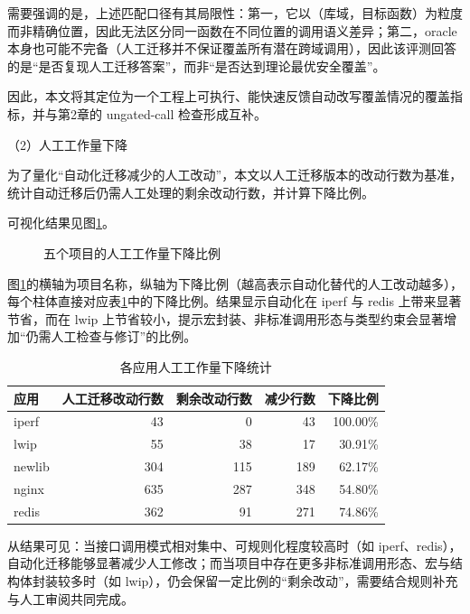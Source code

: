 \documentclass[UTF8,a4paper,12pt]{ctexart}
\numberwithin{equation}{section}
\begin{document}
需要强调的是，上述匹配口径有其局限性：第一，它以（库域，目标函数）为粒度而非精确位置，因此无法区分同一函数在不同位置的调用语义差异；第二，oracle
本身也可能不完备（人工迁移并不保证覆盖所有潜在跨域调用），因此该评测回答的是``是否复现人工迁移答案''，而非``是否达到理论最优安全覆盖''。

因此，本文将其定位为一个工程上可执行、能快速反馈自动改写覆盖情况的覆盖指标，并与第2章的
ungated-call 检查形成互补。

（2）人工工作量下降

为了量化``自动化迁移减少的人工改动''，本文以人工迁移版本的改动行数为基准，统计自动迁移后仍需人工处理的剩余改动行数，并计算下降比例。

可视化结果见图\ref{fig:auto-manual-effort-reduction}。
\begin{figure}
  \centering
  
  \caption{五个项目的人工工作量下降比例}
  \label{fig:auto-manual-effort-reduction}
\end{figure}

图\ref{fig:auto-manual-effort-reduction}的横轴为项目名称，纵轴为下降比例（越高表示自动化替代的人工改动越多），每个柱体直接对应表\ref{tab:manual-effort-reduction-by-app}中的下降比例。结果显示自动化在 iperf 与 redis 上带来显著节省，而在 lwip 上节省较小，提示宏封装、非标准调用形态与类型约束会显著增加``仍需人工检查与修订''的比例。


{\small
\setlength{\tabcolsep}{4pt}
\begin{longtable}{@{}lrrrr@{}}
\caption{各应用人工工作量下降统计}\label{tab:manual-effort-reduction-by-app}\\
\toprule
应用 & 人工迁移改动行数 & 剩余改动行数 & 减少行数 & 下降比例 \\
\midrule
\endhead
\bottomrule
\endlastfoot
iperf & 43 & 0 & 43 & 100.00\% \\
lwip & 55 & 38 & 17 & 30.91\% \\
newlib & 304 & 115 & 189 & 62.17\% \\
nginx & 635 & 287 & 348 & 54.80\% \\
redis & 362 & 91 & 271 & 74.86\% \\
\end{longtable}
}

从结果可见：当接口调用模式相对集中、可规则化程度较高时（如
iperf、redis），自动化迁移能够显著减少人工修改；而当项目中存在更多非标准调用形态、宏与结构体封装较多时（如
lwip），仍会保留一定比例的``剩余改动''，需要结合规则补充与人工审阅共同完成。
\end{document}

